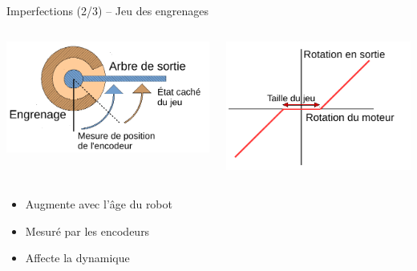 \begin{frame}{Imperfections (2/3) -- Jeu des engrenages}
    \begin{columns}
        \begin{column}{0.5\linewidth}
            \centering
            \includegraphics[type=pdf,ext=.pdf,read=.pdf,width=0.8\linewidth]{../schema/backlash_meca}
        \end{column}
        \begin{column}{0.5\linewidth}
            \centering
            \includegraphics[type=pdf,ext=.pdf,read=.pdf,width=0.8\linewidth]{../schema/backlash_function}
        \end{column}
    \end{columns}
    \vspace{1.0em}
    \begin{itemize}
        \item Augmente avec l'âge du robot
        \item Mesuré par les encodeurs
        \item Affecte la dynamique
    \end{itemize}
\end{frame}

